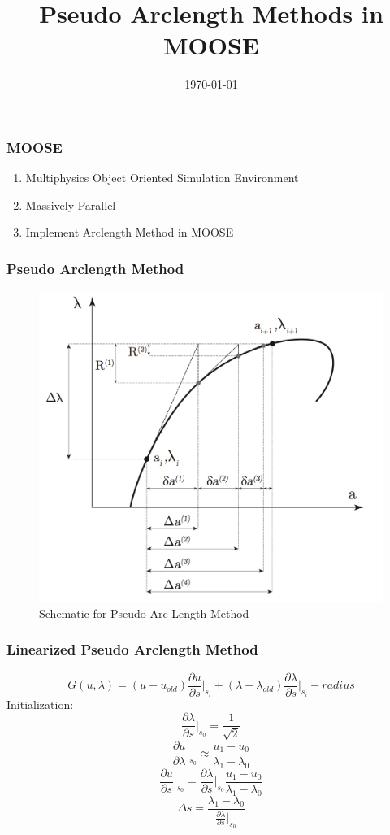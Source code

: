 \documentclass[11pt]{beamer}
\begin{document}
	\title{Pseudo Arclength Methods in MOOSE}
	\date{\today}
	\frame[plain]{\maketitle}
	
	\begin{frame}
		\frametitle{MOOSE}
		\begin{enumerate}
			\item Multiphysics Object Oriented Simulation Environment
			\item Massively Parallel
			\item Implement Arclength Method in MOOSE
		\end{enumerate}
	\end{frame}

	\begin{frame}
		\frametitle{Pseudo Arclength Method}
		
		\begin{figure}
			\centering
			\includegraphics[width=0.5\linewidth]{arclengthschematic}
			\caption{Schematic for Pseudo Arc Length Method \cite{arclength}}
			\label{fig:arclengthschematic}
		\end{figure}
		
	\end{frame}



	\begin{frame}
		\frametitle{Linearized Pseudo Arclength Method}
		$$G(u,\lambda) = (u-u_{old})\frac{\partial u}{\partial s}\Big|_{s_i}+(\lambda-\lambda_{old})\frac{\partial \lambda}{\partial s}\Big|_{s_i} - radius$$	
		Initialization:
		$$\frac{\partial \lambda}{\partial s} \Big|_{s_0} = \frac{1}{\sqrt{2}}$$
		$$\frac{\partial u}{\partial \lambda}\Big|_{s_0} \approx \frac{u_1-u_0}{\lambda_1-\lambda_0} $$ 
		$$\frac{\partial u}{\partial s}\Big|_{s_0} = \frac{\partial \lambda}{\partial s}\Big|_{s_0} \frac{u_1-u_0}{\lambda_1-\lambda_0} $$
		$$\Delta s = \frac{\lambda_1-\lambda_0}{\frac{\partial \lambda}{\partial s}\Big|_{s_0}} $$
		
	\end{frame}
\end{document}
